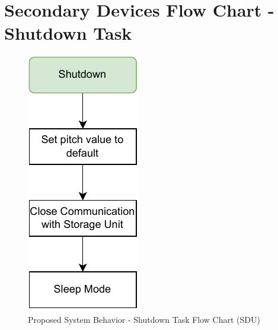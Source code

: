 
\chapter{Secondary Devices Flow Chart - Shutdown Task} %

\label{AppendixD}

\begin{figure}[H]
    \centering
    \includegraphics[scale=0.75,angle=270,origin=c]{appendices/assets/SDU_SHUTDOWN.pdf}
    \caption{Proposed System Behavior - Shutdown Task Flow Chart (SDU)}
    \label{fig:SDU_SHUTDOWN}
\end{figure}

